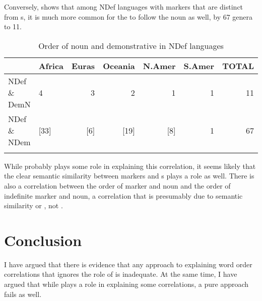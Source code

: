 \documentclass[output=paper]{langsci/langscibook}
\begin{document}
Conversely,  shows that among NDef languages with  markers that are distinct from s, it is much more common for the  to follow the noun as well, by 67 genera to 11.

\begin{table}
\begin{tabularx}{\textwidth}{Xlrrrrr}
\lsptoprule
& \bfseries Africa & \bfseries Euras & \bfseries Oceania & \bfseries N.Amer & \bfseries S.Amer & \bfseries TOTAL\\
\midrule
NDef \& DemN & 4 & 3 & 2 & 1 & 1 & 11\\
NDef \& NDem & [33] & [6] & [19] & [8] & 1 & 67\\
\lspbottomrule
\end{tabularx}
\caption{\label{tab:dryer:15}Order of noun and demonstrative in NDef languages}
\end{table}

While  probably plays some role in explaining this correlation, it seems likely that the clear semantic similarity between  markers and s plays a role as well. There is also a correlation between the order of  marker and noun and the order of indefinite marker and noun, a correlation that is presumably due to semantic similarity or , not .

\section{Conclusion}\label{sec:dryer:5}

I have argued that there is evidence that any approach to explaining word order correlations that ignores the role of  is inadequate. At the same time, I have argued that while  plays a role in explaining some correlations, a pure  approach fails as well.
\end{document}
